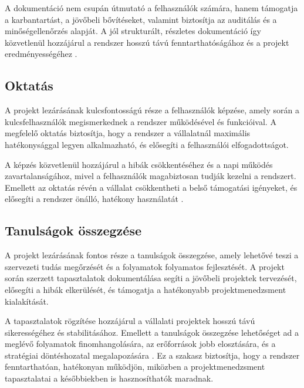 A dokumentáció nem csupán útmutató a felhasználók számára, hanem támogatja a karbantartást, a jövőbeli bővítéseket, valamint biztosítja az auditálás és a minőségellenőrzés alapját.  
A jól strukturált, részletes dokumentáció így közvetlenül hozzájárul a rendszer hosszú távú fenntarthatóságához és a projekt eredményességéhez \cite{Hajdu2014,Kaposi2019}.


\subsection{Oktatás}

A projekt lezárásának kulcsfontosságú része a felhasználók képzése, amely során a kulcsfelhasználók megismerkednek a rendszer működésével és funkcióival.  
A megfelelő oktatás biztosítja, hogy a rendszer a vállalatnál maximális hatékonysággal legyen alkalmazható, és elősegíti a felhasználói elfogadottságot.  

A képzés közvetlenül hozzájárul a hibák csökkentéséhez és a napi működés zavartalanságához, mivel a felhasználók magabiztosan tudják kezelni a rendszert.  
Emellett az oktatás révén a vállalat csökkentheti a belső támogatási igényeket, és elősegíti a rendszer önálló, hatékony használatát \cite{Szalay2018,Kovacs2016}.


\subsection{Tanulságok összegzése}

A projekt lezárásának fontos része a tanulságok összegzése, amely lehetővé teszi 
a szervezeti tudás megőrzését és a folyamatok folyamatos fejlesztését.  
A projekt során szerzett tapasztalatok dokumentálása segíti a jövőbeli projektek 
tervezését, elősegíti a hibák elkerülését, és támogatja a hatékonyabb projektmenedzsment kialakítását.  

A tapasztalatok rögzítése hozzájárul a vállalati projektek hosszú távú sikerességéhez és stabilitásához.  
Emellett a tanulságok összegzése lehetőséget ad a meglévő folyamatok finomhangolására, az erőforrások jobb elosztására, 
és a stratégiai döntéshozatal megalapozására \cite{Hajdu2014,Szalay2018,Kaposi2019}.  
Ez a szakasz biztosítja, hogy a rendszer fenntarthatóan, hatékonyan működjön, miközben 
a projektmenedzsment tapasztalatai a későbbiekben is hasznosíthatók maradnak.

